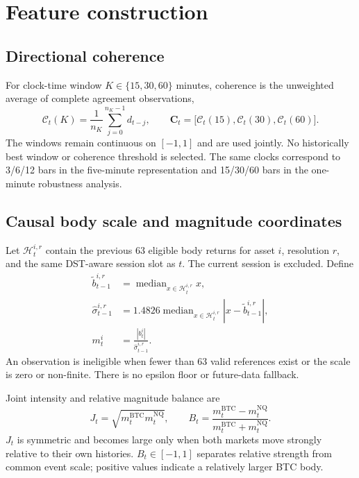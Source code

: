 \documentclass[11pt]{article}
\newcommand{\BTC}{\mathrm{BTC}}
\newcommand{\NQ}{\mathrm{NQ}}
\begin{document}
\section{Feature construction}

\subsection{Directional coherence}

For clock-time window $K\in\{15,30,60\}$ minutes, coherence is the unweighted average of
complete agreement observations,
\begin{equation}
  \mathcal{C}_t(K)=\frac{1}{n_K}\sum_{j=0}^{n_K-1}d_{t-j},
  \qquad
  \mathbf{C}_t=\bigl[\mathcal{C}_t(15),\mathcal{C}_t(30),\mathcal{C}_t(60)\bigr].
  \label{eq:coherence}
\end{equation}
The windows remain continuous on $[-1,1]$ and are used jointly. No historically best
window or coherence threshold is selected. The same clocks correspond to 3/6/12 bars in
the five-minute representation and 15/30/60 bars in the one-minute robustness analysis.

\subsection{Causal body scale and magnitude coordinates}

Let $\mathcal{H}^{i,r}_t$ contain the previous 63 eligible body returns for asset $i$,
resolution $r$, and the same DST-aware session slot as $t$. The current session is
excluded. Define
\begin{align}
  \widetilde b^{i,r}_{t-1}
    &= \operatorname{median}_{x\in\mathcal{H}^{i,r}_t} x, \\
  \widehat\sigma^{i,r}_{t-1}
    &= 1.4826\operatorname{median}_{x\in\mathcal{H}^{i,r}_t}
       \left|x-\widetilde b^{i,r}_{t-1}\right|, \\
  m^i_t &= \frac{|b^i_t|}{\widehat\sigma^{i,r}_{t-1}}.
  \label{eq:scale}
\end{align}
An observation is ineligible when fewer than 63 valid references exist or the scale is
zero or non-finite. There is no epsilon floor or future-data fallback.

Joint intensity and relative magnitude balance are
\begin{equation}
  J_t=\sqrt{m^{\BTC}_t m^{\NQ}_t},
  \qquad
  B_t=\frac{m^{\BTC}_t-m^{\NQ}_t}{m^{\BTC}_t+m^{\NQ}_t}.
  \label{eq:magnitude}
\end{equation}
$J_t$ is symmetric and becomes large only when both markets move strongly relative to
their own histories. $B_t\in[-1,1]$ separates relative strength from common event scale;
positive values indicate a relatively larger BTC body.
\end{document}
